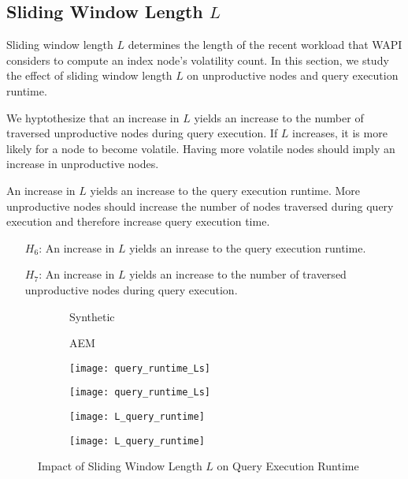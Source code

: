 \documentclass[abstracton,12pt]{scrartcl}
\theoremstyle{definition}
\begin{document}
\subsection{Sliding Window Length $L$}

Sliding window length $L$ determines the length of the recent workload that WAPI
considers to compute an index node's volatility count. In this section, we study
the effect of sliding window length $L$ on unproductive nodes and query
execution runtime.

We hyptothesize that an increase in $L$ yields an increase to the number of
traversed unproductive nodes during query execution. If $L$ increases, it is
more likely for a node to become volatile. Having more volatile nodes should
imply an increase in unproductive nodes.

An increase in $L$ yields an increase to the query execution runtime. More
unproductive nodes should increase the number of nodes traversed
during query execution and therefore increase query execution time.

\begin{shaded}
  \begin{itemize}
  \item[$H_6$:] An increase in $L$ yields an inrease to the query execution runtime. 
  \item[$H_7$:] An increase in $L$ yields an increase to the number of
    traversed unproductive nodes during query execution.
  \end{itemize}
\end{shaded}

\begin{figure}[h]
  \centering
  \begin{subfigure}{0.49\linewidth}
    \centering
    Synthetic
  \end{subfigure}
  \begin{subfigure}{0.49\linewidth}
    \centering
    AEM
  \end{subfigure}
  \begin{subfigure}{0.49\linewidth}
    \centering
    \texttt{[image: query\_runtime\_Ls]}
    \caption{}
    \label{fig:query_runtime_Ls_synthetic}
  \end{subfigure}
  \begin{subfigure}{0.49\linewidth}
    \centering
    \texttt{[image: query\_runtime\_Ls]}
    \caption{}
    \label{fig:query_runtime_Ls_aem}
  \end{subfigure}
  \begin{subfigure}{0.49\linewidth}
    \centering
    \texttt{[image: L\_query\_runtime]}
    \caption{}
    \label{fig:L_query_runtime_synthetic}
  \end{subfigure}
  \begin{subfigure}{0.49\linewidth}
    \centering
    \texttt{[image: L\_query\_runtime]}
    \caption{}
    \label{fig:L_query_runtime_aem}
  \end{subfigure}
  \caption{Impact of Sliding Window Length $L$ on Query Execution Runtime}
\end{figure}
\end{document}
